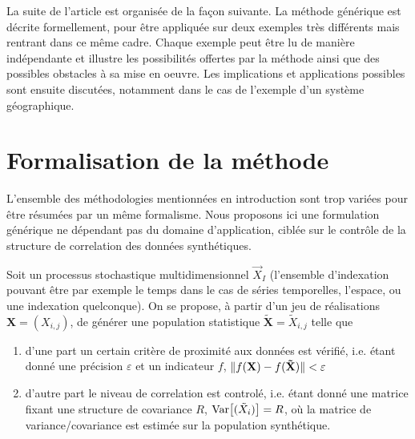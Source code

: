 La suite de l'article est organisée de la façon suivante. La méthode générique est décrite formellement, pour être appliquée sur deux exemples très différents mais rentrant dans ce même cadre. Chaque exemple peut être lu de manière indépendante et illustre les possibilités offertes par la méthode ainsi que des possibles obstacles à sa mise en oeuvre. Les implications et applications possibles sont ensuite discutées, notamment dans le cas de l'exemple d'un système géographique.


\section{Formalisation de la méthode}

L'ensemble des méthodologies mentionnées en introduction sont trop variées pour être résumées par un même formalisme. Nous proposons ici une formulation générique ne dépendant pas du domaine d'application, ciblée sur le contrôle de la structure de correlation des données synthétiques.

Soit un processus stochastique multidimensionnel $\vec{X}_I$ (l'ensemble d'indexation pouvant être par exemple le temps dans le cas de séries temporelles, l'espace, ou une indexation quelconque). On se propose, à partir d'un jeu de réalisations $\mathbf{X}=(X_{i,j})$, de générer une population statistique $\mathbf{\tilde{X}}=\tilde{X}_{i,j}$ telle que
\begin{enumerate}
\item d'une part un certain critère de proximité aux données est vérifié, i.e. étant donné une précision $\varepsilon$ et un indicateur $f$, $\| f(\mathbf{X})-f(\mathbf{\tilde{X}}) \| < \varepsilon$
\item d'autre part le niveau de correlation est controlé, i.e. étant donné une matrice fixant une structure de covariance $R$, $\operatorname{Var}\!\left[(\tilde{X}_i)\right] = R$, où la matrice de variance/covariance est estimée sur la population synthétique.
\end{enumerate}

